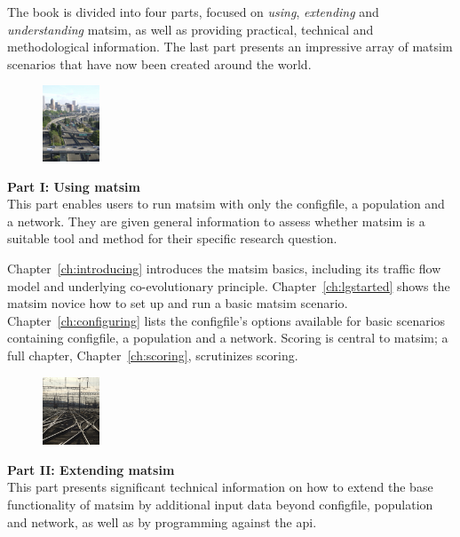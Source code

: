 The book is divided into four parts, focused on \emph{using}, \emph{extending} and \emph{understanding} \gls{matsim}, as well as providing practical, technical and methodological information. The last part presents an impressive array of  \gls{matsim} scenarios that have now been created around the world. %

\clearpage
\begin{figure}
\vspace{-5pt}
  \begin{center}
    \includegraphics[width=0.15\textwidth]{images/DSCF2906.jpg}
  \end{center}
\end{figure}
\textbf{Part I: Using \acrshort{matsim}}\\
This part enables users to run \gls{matsim} with only the \gls{configfile}, a population and a network. They are given general information to assess whether \gls{matsim} is a suitable tool and method for their specific research question.

Chapter~\ref{ch:introducing} introduces the \gls{matsim} basics, including its traffic flow model and underlying co-evolutionary principle. 
Chapter~\ref{ch:lgstarted} shows the \gls{matsim} novice how to set up and run a basic \gls{matsim} \gls{scenario}. 
Chapter~\ref{ch:configuring} lists the \gls{configfile}'s options available for basic scenarios containing \gls{configfile}, a population and a network.  
Scoring is central to \gls{matsim}; a full chapter, Chapter~\ref{ch:scoring}, scrutinizes scoring. 

\begin{figure}
\vspace{-10pt}
  \begin{center}
    \includegraphics[width=0.15\textwidth]{images/DSCF5871.jpg}
  \end{center}
\end{figure}
\textbf{Part II: Extending \acrshort{matsim}}\\
This part presents significant technical information on how to extend the base functionality of \gls{matsim} by additional input data beyond \gls{configfile}, population and network, as well as by programming against the \gls{api}. 

